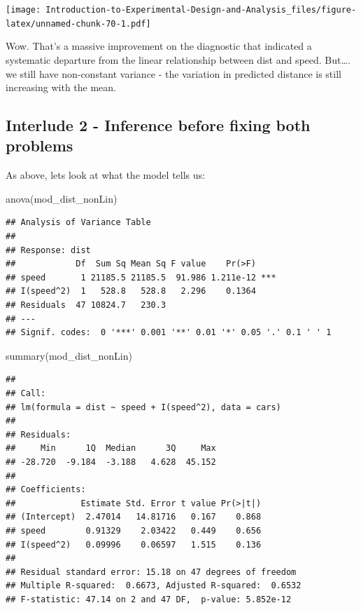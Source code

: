 \documentclass[
]{book}
\newenvironment{Shaded}{\begin{snugshade}}{\end{snugshade}}
\newcommand{\FunctionTok}[1]{\textcolor[rgb]{0.00,0.00,0.00}{#1}}
\newcommand{\NormalTok}[1]{#1}
\begin{document}
\texttt{[image: Introduction-to-Experimental-Design-and-Analysis\_files/figure-latex/unnamed-chunk-70-1.pdf]}

Wow. That's a massive improvement on the diagnostic that indicated a systematic departure from the linear relationship between dist and speed. But\ldots. we still have non-constant variance - the variation in predicted distance is still increasing with the mean.

\hypertarget{interlude-2---inference-before-fixing-both-problems}{%
\subsection{Interlude 2 - Inference before fixing both problems}\label{interlude-2---inference-before-fixing-both-problems}}

As above, lets look at what the model tells us:

\begin{Shaded}
\begin{Highlighting}[]
\FunctionTok{anova}\NormalTok{(mod\_dist\_nonLin)}
\end{Highlighting}
\end{Shaded}

\begin{verbatim}
## Analysis of Variance Table
## 
## Response: dist
##            Df  Sum Sq Mean Sq F value    Pr(>F)    
## speed       1 21185.5 21185.5  91.986 1.211e-12 ***
## I(speed^2)  1   528.8   528.8   2.296    0.1364    
## Residuals  47 10824.7   230.3                      
## ---
## Signif. codes:  0 '***' 0.001 '**' 0.01 '*' 0.05 '.' 0.1 ' ' 1
\end{verbatim}

\begin{Shaded}
\begin{Highlighting}[]
\FunctionTok{summary}\NormalTok{(mod\_dist\_nonLin)}
\end{Highlighting}
\end{Shaded}

\begin{verbatim}
## 
## Call:
## lm(formula = dist ~ speed + I(speed^2), data = cars)
## 
## Residuals:
##     Min      1Q  Median      3Q     Max 
## -28.720  -9.184  -3.188   4.628  45.152 
## 
## Coefficients:
##             Estimate Std. Error t value Pr(>|t|)
## (Intercept)  2.47014   14.81716   0.167    0.868
## speed        0.91329    2.03422   0.449    0.656
## I(speed^2)   0.09996    0.06597   1.515    0.136
## 
## Residual standard error: 15.18 on 47 degrees of freedom
## Multiple R-squared:  0.6673, Adjusted R-squared:  0.6532 
## F-statistic: 47.14 on 2 and 47 DF,  p-value: 5.852e-12
\end{verbatim}
\end{document}

